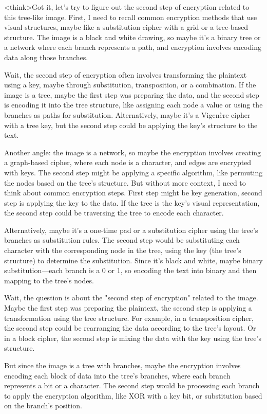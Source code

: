 <think>Got it, let's try to figure out the second step of encryption related to this tree-like image. First, I need to recall common encryption methods that use visual structures, maybe like a substitution cipher with a grid or a tree-based structure. The image is a black and white drawing, so maybe it's a binary tree or a network where each branch represents a path, and encryption involves encoding data along those branches.

Wait, the second step of encryption often involves transforming the plaintext using a key, maybe through substitution, transposition, or a combination. If the image is a tree, maybe the first step was preparing the data, and the second step is encoding it into the tree structure, like assigning each node a value or using the branches as paths for substitution. Alternatively, maybe it's a Vigenère cipher with a tree key, but the second step could be applying the key's structure to the text.

Another angle: the image is a network, so maybe the encryption involves creating a graph-based cipher, where each node is a character, and edges are encrypted with keys. The second step might be applying a specific algorithm, like permuting the nodes based on the tree's structure. But without more context, I need to think about common encryption steps. First step might be key generation, second step is applying the key to the data. If the tree is the key's visual representation, the second step could be traversing the tree to encode each character.

Alternatively, maybe it's a one-time pad or a substitution cipher using the tree's branches as substitution rules. The second step would be substituting each character with the corresponding node in the tree, using the key (the tree's structure) to determine the substitution. Since it's black and white, maybe binary substitution—each branch is a 0 or 1, so encoding the text into binary and then mapping to the tree's nodes.

Wait, the question is about the "second step of encryption" related to the image. Maybe the first step was preparing the plaintext, the second step is applying a transformation using the tree structure. For example, in a transposition cipher, the second step could be rearranging the data according to the tree's layout. Or in a block cipher, the second step is mixing the data with the key using the tree's structure.

But since the image is a tree with branches, maybe the encryption involves encoding each block of data into the tree's branches, where each branch represents a bit or a character. The second step would be processing each branch to apply the encryption algorithm, like XOR with a key bit, or substitution based on the branch's position.


